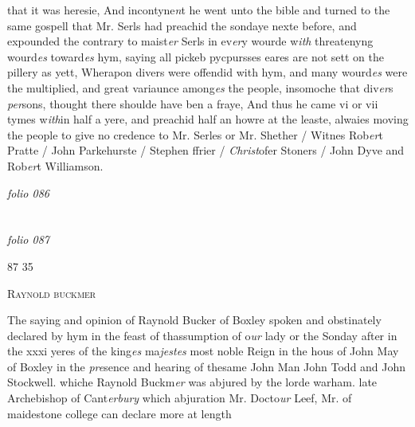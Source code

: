 \documentclass[12pt, a4paper]{book}
\begin{document}
		\ifthenelse{\isodd{\thepage}}
		{\reversemarginpar}
		{\normalmarginpar}
		that it was heresie, And incontyne\textit{n}t he went unto the bible
 and turned to the same gospell that Mr. Serls had preachid
 the sondaye nexte before, and expounded the contrary to maist\textit{er}
 Serls in ev\textit{er}y wourde w\textit{ith} threatenyng wourd\textit{es} toward\textit{es} hym, saying
 all pickeb pycpursses eares are not sett on the pillery as yett,
 Wherapon divers were offendid with hym, and many wourd\textit{es} were
 the multiplied, and great variaunce among\textit{es} the people, insomoche
 that div\textit{er}s \textit{per}sons, thought there shoulde have ben a fraye, And
 thus he came vi or vii tymes w\textit{ith}in half a yere, and preachid
 half an howre at the leaste, alwaies moving the people to
 give no credence to Mr. Serles or Mr. Shether / Witnes
	Rob\textit{er}t Pratte / John Parkehurste / Stephen ffrier / \textit{Christ}ofer
		Stoners / John Dyve and Rob\textit{er}t Williamson.


            
\dotfill
						\newpage
{}

\textit{folio 086}


         \vspace*{4cm}
         
\dotfill
						  \section*{}

\textit{folio 087}



\begin{flushright}{\color{Mahogany}87} 35\end{flushright}
 

	
				\begin{center} \begin{large} {\scshape Raynold buckmer} \end{large} \end{center}
			
	
		
				\marginpar[\vspace{0.5cm}{\textcolor{Gray}{n}}]{}
			
		
		\ifthenelse{\isodd{\thepage}}
		{\reversemarginpar}
		{\normalmarginpar}
		The saying and opinion of Raynold Bucker of
 Boxley spoken and obstinately declared by
 hym in the feast of thassumption of o\textit{ur} lady
 or the Sonday after in the xxxi yeres
 of the king\textit{es} ma\textit{jestes} most noble Reign in the
 	hous of John May of Boxley in the \textit{pre}sence
			and hearing of thesame John Man John
				Todd and John Stockwell. whiche
			Raynold Buckm\textit{er} was abjured by the
			lorde warham. late Archebishop of Cant\textit{erbury}
			which abjuration Mr. Docto\textit{ur} Leef, Mr.
 of maidestone college can declare more
 at length
 
\end{document}
